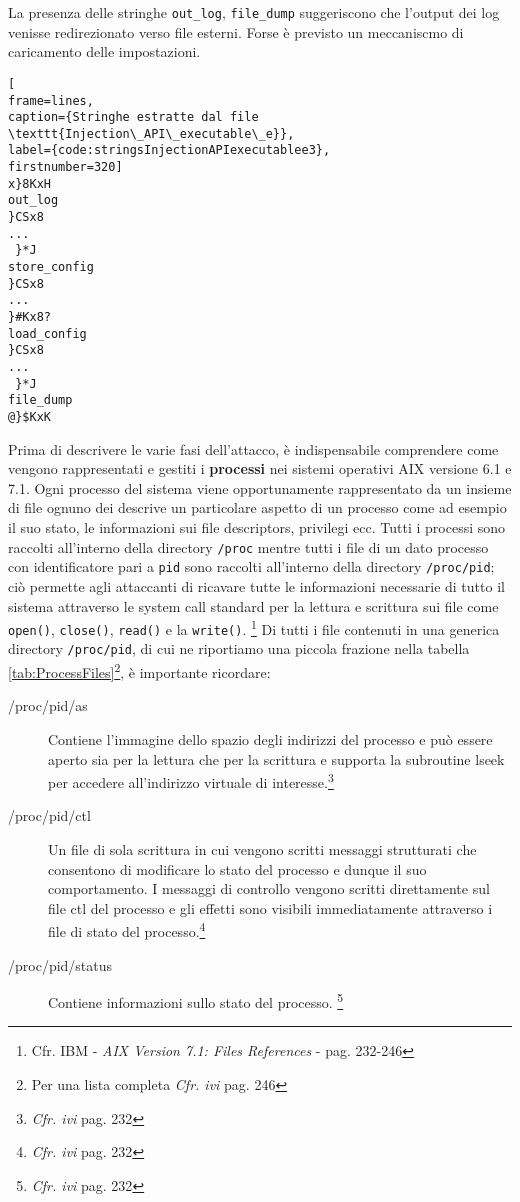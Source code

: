 \documentclass[10pt,a4paper, titlepage]{report}
\begin{document}
La presenza delle stringhe \texttt{out\_log}, \texttt{file\_dump} suggeriscono che l'output dei log venisse redirezionato verso file esterni. Forse è previsto un meccaniscmo di caricamento delle impostazioni.

\begin{lstlisting}[
frame=lines, 
caption={Stringhe estratte dal file \texttt{Injection\_API\_executable\_e}}, 
label={code:stringsInjectionAPIexecutablee3},
firstnumber=320]
x}8KxH
out_log
}CSx8
...
 }*J
store_config
}CSx8
...
}#Kx8?
load_config
}CSx8
...
 }*J
file_dump
@}$KxK
\end{lstlisting}


Prima di descrivere le varie fasi dell'attacco, è indispensabile comprendere come vengono rappresentati e gestiti i \textbf{processi} nei sistemi operativi AIX versione 6.1 e 7.1. 
Ogni processo del sistema viene opportunamente rappresentato da un insieme di file ognuno dei descrive un particolare aspetto di un processo come ad esempio il suo stato, le informazioni sui file descriptors, privilegi ecc.
Tutti i processi sono raccolti all'interno della directory \texttt{/proc} mentre tutti i file di un dato processo con identificatore pari a \texttt{pid} sono raccolti all'interno della directory \texttt{/proc/pid}; ciò permette agli attaccanti di
ricavare tutte le informazioni necessarie di tutto il sistema attraverso le system call standard per la lettura e scrittura sui file come \texttt{open()}, \texttt{close()}, \texttt{read()} e la \texttt{write()}. \footnote{Cfr. IBM - \textit{AIX Version 7.1: Files References} - pag. 232-246}
Di tutti i file contenuti in una generica directory \texttt{/proc/pid}, di cui ne riportiamo una piccola frazione nella tabella \ref{tab:ProcessFiles}\footnote{Per una lista completa \textit{Cfr. ivi} pag. 246}, è importante ricordare:

\begin{description}
\item[/proc/pid/as] Contiene l'immagine dello spazio degli indirizzi del processo e può essere aperto sia per la lettura che per la scrittura e supporta la subroutine lseek per accedere all'indirizzo virtuale di interesse.\footnote{\textit{Cfr. ivi} pag. 232}

\item[/proc/pid/ctl] Un file di sola scrittura in cui vengono scritti messaggi strutturati che consentono di modificare lo stato del processo e dunque il suo comportamento. I messaggi di controllo vengono scritti direttamente sul file ctl del processo e gli effetti sono visibili immediatamente attraverso i file di stato del processo.\footnote{\textit{Cfr. ivi} pag. 232}

\item[/proc/pid/status] Contiene informazioni sullo stato del processo. \footnote{\textit{Cfr. ivi} pag. 232}
\end{description}
\end{document}
